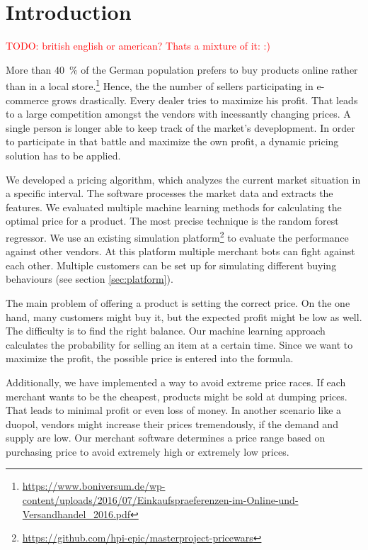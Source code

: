 \section{Introduction}

\textcolor{red}{TODO: british english or american? Thats a mixture of it: :)}

\noindent More than 40~\% of the German population prefers to buy products online rather than in a local store.\footnote{\href{https://www.boniversum.de/wp-content/uploads/2016/07/Einkaufspraeferenzen-im-Online-und-Versandhandel\_2016.pdf}{https://www.boniversum.de/wp-content/uploads/2016/07/Einkaufspraeferenzen-im-Online-und-Versandhandel\_2016.pdf}} Hence, the the number of sellers participating in e-commerce grows drastically. Every dealer tries to maximize his profit. That leads to a large competition amongst the vendors with incessantly changing prices. A single person is longer able to keep track of the market's deveplopment. In order to participate in that battle and maximize the own profit, a dynamic pricing solution has to be applied.

We developed a pricing algorithm, which analyzes the current market situation in a specific interval. The software processes the market data and extracts the features. We evaluated multiple machine learning methods for calculating the optimal price for a product. The most precise technique is the random forest regressor. We use an existing simulation platform\footnote{\href{https://github.com/hpi-epic/masterproject-pricewars}{https://github.com/hpi-epic/masterproject-pricewars}} to evaluate the performance against other vendors. At this platform multiple merchant bots can fight against each other. Multiple customers can be set up for simulating different buying behaviours (see section \ref{sec:platform}). 

The main problem of offering a product is setting the correct price. On the one hand, many customers might buy it, but the expected profit might be low as well. The difficulty is to find the right balance. Our machine learning approach calculates the probability for selling an item at a certain time. Since we want to maximize the profit, the possible price is entered into the formula.

Additionally, we have implemented a way to avoid extreme price races. If each merchant wants to be the cheapest, products might be sold at dumping prices. That leads to minimal profit or even loss of money. In another scenario like a duopol, vendors might increase their prices tremendously, if the demand and supply are low. Our merchant software determines a price range based on purchasing price to avoid extremely high or extremely low prices.

